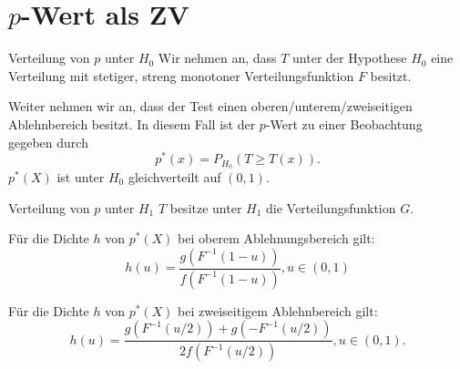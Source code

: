 \section{\(p\)-Wert als ZV}

\begin{karte}{Verteilung von \(p\) unter \(H_0\)}
Wir nehmen an, dass \(T\) unter der Hypothese \(H_0\) eine Verteilung 
mit stetiger, streng monotoner Verteilungsfunktion \(F\) besitzt. 

Weiter nehmen wir an, dass der Test einen oberen/unterem/zweiseitigen Ablehnbereich besitzt. 
In diesem Fall ist der \(p\)-Wert zu einer Beobachtung gegeben durch 
\[ p^*(x) = P_{H_0}(T \geq T(x)). \]
\(p^*(X)\) ist unter \(H_0\) gleichverteilt auf \((0,1)\).
\end{karte}

\begin{karte}{Verteilung von \(p\) unter \(H_1\)}
\(T\) besitze unter \(H_1\) die Verteilungsfunktion \(G\).

Für die Dichte \(h\) von \(p^*(X)\) bei oberem Ablehnungsbereich gilt: 
\[ h(u) = \frac{g(F^{-1}(1-u))}{f(F^{-1}(1-u))}, u\in (0,1) \]

Für die Dichte \(h\) von \(p^*(X)\) bei zweiseitigem Ablehnbereich gilt: 
\[ h(u) = \frac{g(F^{-1}(u/2)) + g(-F^{-1}(u/2))}{2f(F^{-1}(u/2))}, u\in (0,1). \]
\end{karte}